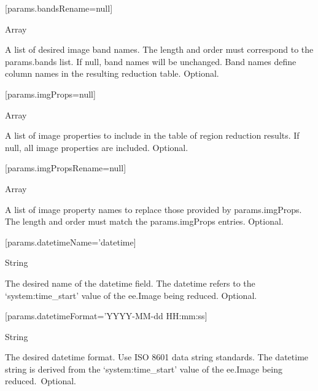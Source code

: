 \documentclass[
  letterpaper,
  DIV=11,
  numbers=noendperiod]{scrreprt}
\begin{document}
{[}params.bandsRename=null{]}

Array

A list of desired image band names. The length and order must correspond
to the params.bands list. If null, band names will be unchanged. Band
names define column names in the resulting reduction table. Optional.

{[}params.imgProps=null{]}

Array

A list of image properties to include in the table of region reduction
results. If null, all image properties are included. Optional.

{[}params.imgPropsRename=null{]}

Array

A list of image property names to replace those provided by
params.imgProps. The length and order must match the params.imgProps
entries. Optional.

{[}params.datetimeName='datetime{]}

String

The desired name of the datetime field. The datetime refers to the
`system:time\_start' value of the ee.Image being reduced. Optional.

{[}params.datetimeFormat='YYYY-MM-dd HH:mm:ss{]}

String

The desired datetime format. Use ISO 8601 data string standards. The
datetime string is derived from the `system:time\_start' value of the
ee.Image being reduced.~Optional.
\end{document}
